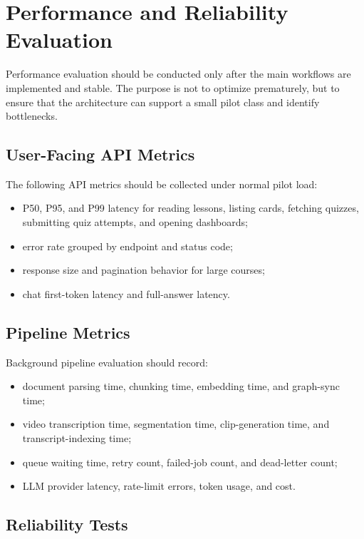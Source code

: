 \section{Performance and Reliability Evaluation}

Performance evaluation should be conducted only after the main workflows are
implemented and stable. The purpose is not to optimize prematurely, but to
ensure that the architecture can support a small pilot class and identify
bottlenecks.

\subsection{User-Facing API Metrics}

The following API metrics should be collected under normal pilot load:

\begin{itemize}
    \item P50, P95, and P99 latency for reading lessons, listing cards,
          fetching quizzes, submitting quiz attempts, and opening dashboards;
    \item error rate grouped by endpoint and status code;
    \item response size and pagination behavior for large courses;
    \item chat first-token latency and full-answer latency.
\end{itemize}

\subsection{Pipeline Metrics}

Background pipeline evaluation should record:

\begin{itemize}
    \item document parsing time, chunking time, embedding time, and graph-sync
          time;
    \item video transcription time, segmentation time, clip-generation time,
          and transcript-indexing time;
    \item queue waiting time, retry count, failed-job count, and dead-letter
          count;
    \item LLM provider latency, rate-limit errors, token usage, and cost.
\end{itemize}

\subsection{Reliability Tests}

